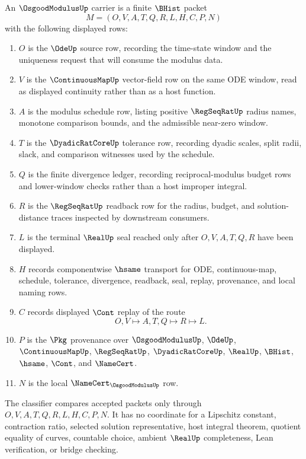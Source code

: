 \begin{definition}
\label{def:osgood-modulus-carrier}
An $\OsgoodModulusUp$ carrier is a finite $\BHist$ packet
$$
M=(O,V,A,T,Q,R,L,H,C,P,N)
$$
with the following displayed rows:
\begin{enumerate}
\item $O$ is the $\OdeUp$ source row, recording the time-state window and the uniqueness request that will consume the modulus data.
\item $V$ is the $\ContinuousMapUp$ vector-field row on the same ODE window, read as displayed continuity rather than as a host function.
\item $A$ is the modulus schedule row, listing positive $\RegSeqRatUp$ radius names, monotone comparison bounds, and the admissible near-zero window.
\item $T$ is the $\DyadicRatCoreUp$ tolerance row, recording dyadic scales, split radii, slack, and comparison witnesses used by the schedule.
\item $Q$ is the finite divergence ledger, recording reciprocal-modulus budget rows and lower-window checks rather than a host improper integral.
\item $R$ is the $\RegSeqRatUp$ readback row for the radius, budget, and solution-distance traces inspected by downstream consumers.
\item $L$ is the terminal $\RealUp$ seal reached only after $O,V,A,T,Q,R$ have been displayed.
\item $H$ records componentwise $\hsame$ transport for ODE, continuous-map, schedule, tolerance, divergence, readback, seal, replay, provenance, and local naming rows.
\item $C$ records displayed $\Cont$ replay of the route
$$
O,V \longmapsto A,T,Q \longmapsto R \longmapsto L .
$$
\item $P$ is the $\Pkg$ provenance over $\OsgoodModulusUp$, $\OdeUp$, $\ContinuousMapUp$, $\RegSeqRatUp$, $\DyadicRatCoreUp$, $\RealUp$, $\BHist$, $\hsame$, $\Cont$, and $\NameCert$.
\item $N$ is the local $\NameCert_{\OsgoodModulusUp}$ row.
\end{enumerate}
The classifier compares accepted packets only through $O,V,A,T,Q,R,L,H,C,P,N$. It has no coordinate for a Lipschitz constant, contraction ratio, selected solution representative, host integral theorem, quotient equality of curves, countable choice, ambient $\RealUp$ completeness, Lean verification, or bridge checking.
\end{definition}

